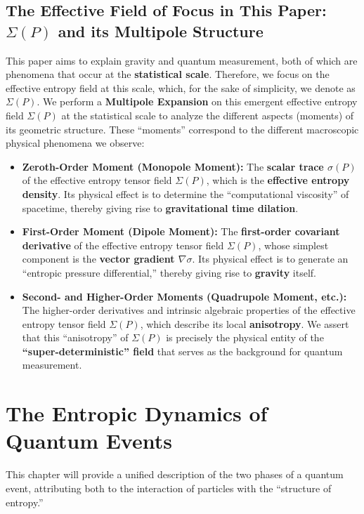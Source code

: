 \documentclass[11pt]{article}
\begin{document}
\subsection{The Effective Field of Focus in This Paper: $\Sigma(P)$ and its Multipole Structure}
This paper aims to explain gravity and quantum measurement, both of which are phenomena that occur at the \textbf{statistical scale}. Therefore, we focus on the effective entropy field at this scale, which, for the sake of simplicity, we denote as $\Sigma(P)$. We perform a \textbf{Multipole Expansion} on this emergent effective entropy field $\Sigma(P)$ at the statistical scale to analyze the different aspects (moments) of its geometric structure. These ``moments'' correspond to the different macroscopic physical phenomena we observe:

\begin{itemize}
    \item \textbf{Zeroth-Order Moment (Monopole Moment):} The \textbf{scalar trace $\sigma(P)$} of the effective entropy tensor field $\Sigma(P)$, which is the \textbf{effective entropy density}. Its physical effect is to determine the ``computational viscosity'' of spacetime, thereby giving rise to \textbf{gravitational time dilation}.
    
    \item \textbf{First-Order Moment (Dipole Moment):} The \textbf{first-order covariant derivative} of the effective entropy tensor field $\Sigma(P)$, whose simplest component is the \textbf{vector gradient $\nabla\sigma$}. Its physical effect is to generate an ``entropic pressure differential,'' thereby giving rise to \textbf{gravity} itself.
    
    \item \textbf{Second- and Higher-Order Moments (Quadrupole Moment, etc.):} The higher-order derivatives and intrinsic algebraic properties of the effective entropy tensor field $\Sigma(P)$, which describe its local \textbf{anisotropy}. We assert that this ``anisotropy'' of $\Sigma(P)$ is precisely the physical entity of the \textbf{``super-deterministic'' field} that serves as the background for quantum measurement.
\end{itemize}


\section{The Entropic Dynamics of Quantum Events}

This chapter will provide a unified description of the two phases of a quantum event, attributing both to the interaction of particles with the ``structure of entropy.''
\end{document}
